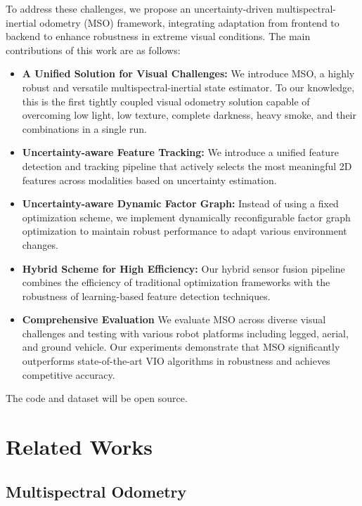 To address these challenges, we propose an uncertainty-driven multispectral-inertial odometry (MSO) framework, integrating adaptation from frontend to backend to enhance robustness  in extreme visual conditions. The main contributions of this work are as follows:

\begin{itemize}
\item \textbf{A Unified Solution for Visual Challenges:} We introduce MSO, a highly robust and versatile multispectral-inertial state estimator. To our knowledge, this is the first tightly coupled visual odometry solution capable of overcoming low light, low texture, complete darkness, heavy smoke, and their combinations in a single run.

\item \textbf{Uncertainty-aware Feature Tracking:} We introduce a unified feature detection and tracking pipeline that actively selects the most meaningful 2D features across modalities based on uncertainty estimation.


\item \textbf{Uncertainty-aware Dynamic Factor Graph:} Instead of using a fixed optimization scheme, we implement dynamically reconfigurable factor graph optimization to maintain robust performance to adapt various environment changes.

\item \textbf{Hybrid Scheme for High Efficiency:} Our hybrid sensor fusion pipeline combines the efficiency of traditional optimization frameworks with the robustness of learning-based feature detection techniques.


\item \textbf{Comprehensive Evaluation}  We evaluate MSO across diverse visual challenges and testing with various robot platforms including legged, aerial, and ground vehicle. Our experiments demonstrate that MSO significantly outperforms state-of-the-art VIO algorithms in robustness and achieves competitive accuracy. 

\end{itemize}
The code and dataset will be open source.

\section{Related Works}
\subsection{Multispectral Odometry}

